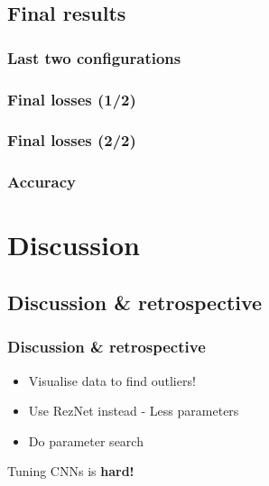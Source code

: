 \documentclass{beamer}
\begin{document}
\subsection{Final results}
\begin{frame}
  \frametitle{Last two configurations}
  
\end{frame}

\begin{frame}
  \frametitle{Final losses (1/2)}
  
\end{frame}

\begin{frame}
  \frametitle{Final losses (2/2)}
  
\end{frame}

\begin{frame}
  \frametitle{Accuracy}
  
\end{frame}

\section{Discussion}
\subsection{Discussion \& retrospective}
\begin{frame}
  \frametitle{Discussion \& retrospective}
  \begin{itemize}
    \item Visualise data to find outliers!
    \item Use RezNet instead - Less parameters
    \item Do parameter search
  \end{itemize}
  Tuning CNNs is \textbf{hard!}
\end{frame}
\end{document}
